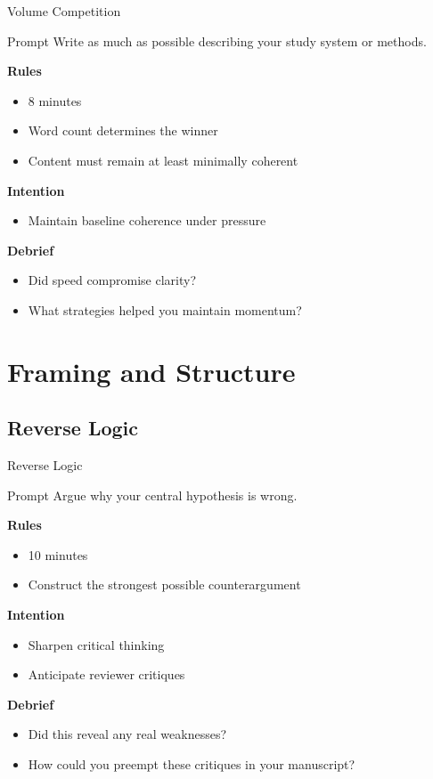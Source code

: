 \documentclass{beamer}
\begin{document}
\begin{frame}{Volume Competition}
\begin{block}{Prompt}
Write as much as possible describing your study system or methods.
\end{block}

\vspace{0.8em}
\textbf{Rules}
\begin{itemize}
    \item 8 minutes
    \item Word count determines the winner
    \item Content must remain at least minimally coherent
\end{itemize}

\textbf{Intention}
\begin{itemize}
    \item Maintain baseline coherence under pressure
\end{itemize}

\textbf{Debrief}
\begin{itemize}
    \item Did speed compromise clarity?
    \item What strategies helped you maintain momentum?
\end{itemize}
\end{frame}

\section{Framing and Structure}

\subsection{Reverse Logic}

\begin{frame}{Reverse Logic}
\begin{block}{Prompt}
Argue why your central hypothesis is wrong.
\end{block}

\vspace{0.8em}
\textbf{Rules}
\begin{itemize}
    \item 10 minutes
    \item Construct the strongest possible counterargument
\end{itemize}

\textbf{Intention}
\begin{itemize}
    \item Sharpen critical thinking
    \item Anticipate reviewer critiques
\end{itemize}

\textbf{Debrief}
\begin{itemize}
    \item Did this reveal any real weaknesses?
    \item How could you preempt these critiques in your manuscript?
\end{itemize}
\end{frame}
\end{document}
